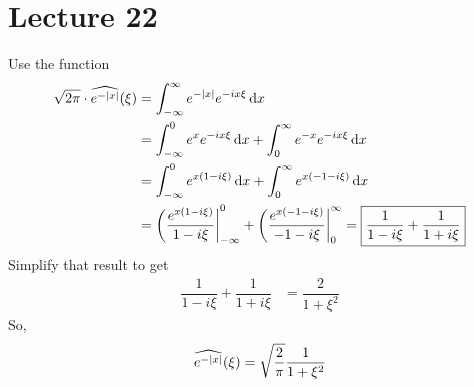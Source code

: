 \section{Lecture 22}
Use the function
\begin{align}
    \sqrt{2\pi} \cdot \widehat{e^{-\abs{x}}}(\xi) &= \int_{-\infty}^\infty e^{-\abs{x}} e^{-ix\xi} \dd{x}\\
    &= \int_{-\infty}^0 e^{x} e^{-ix\xi} \dd{x} + \int_{0}^\infty e^{-x} e^{-ix\xi} \dd{x}\\
    &= \int_{-\infty}^0 e^{x(1-i\xi)} \dd{x} + \int_{0}^\infty e^{x(-1-i\xi)} \dd{x}\\
    &= \eval(\dfrac{e^{x(1-i\xi)}}{1-i\xi}|_{-\infty}^0 + \eval(\dfrac{e^{x(-1-i\xi)}}{-1-i\xi}|_0^\infty = \boxed{\dfrac{1}{1-i\xi} + \dfrac{1}{1+i\xi}}
\end{align}
Simplify that result to get
\begin{align}
    \dfrac{1}{1-i\xi} + \dfrac{1}{1+i\xi} &= \boxed{\dfrac{2}{1+\xi^2}}
\end{align}
So,
\begin{align}
    \widehat{e^{-\abs{x}}}(\xi) = \sqrt{\dfrac{2}{\pi}} \dfrac{1}{1+\xi^2}
\end{align}

